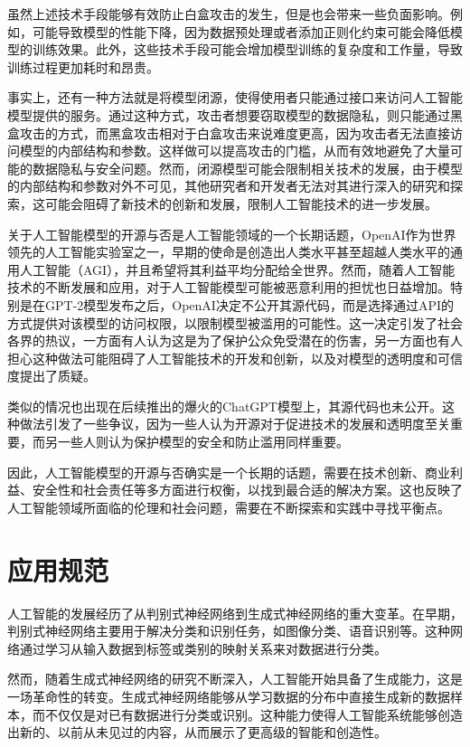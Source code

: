 虽然上述技术手段能够有效防止白盒攻击的发生，但是也会带来一些负面影响。例如，可能导致模型的性能下降，因为数据预处理或者添加正则化约束可能会降低模型的训练效果。此外，这些技术手段可能会增加模型训练的复杂度和工作量，导致训练过程更加耗时和昂贵。

事实上，还有一种方法就是将模型闭源，使得使用者只能通过接口来访问人工智能模型提供的服务。通过这种方式，攻击者想要窃取模型的数据隐私，则只能通过黑盒攻击的方式，而黑盒攻击相对于白盒攻击来说难度更高，因为攻击者无法直接访问模型的内部结构和参数。这样做可以提高攻击的门槛，从而有效地避免了大量可能的数据隐私与安全问题。然而，闭源模型可能会限制相关技术的发展，由于模型的内部结构和参数对外不可见，其他研究者和开发者无法对其进行深入的研究和探索，这可能会阻碍了新技术的创新和发展，限制人工智能技术的进一步发展。

关于人工智能模型的开源与否是人工智能领域的一个长期话题，OpenAI作为世界领先的人工智能实验室之一，早期的使命是创造出人类水平甚至超越人类水平的通用人工智能（AGI），并且希望将其利益平均分配给全世界。然而，随着人工智能技术的不断发展和应用，对于人工智能模型可能被恶意利用的担忧也日益增加。特别是在GPT-2模型发布之后，OpenAI决定不公开其源代码，而是选择通过API的方式提供对该模型的访问权限，以限制模型被滥用的可能性。这一决定引发了社会各界的热议，一方面有人认为这是为了保护公众免受潜在的伤害，另一方面也有人担心这种做法可能阻碍了人工智能技术的开发和创新，以及对模型的透明度和可信度提出了质疑。

类似的情况也出现在后续推出的爆火的ChatGPT模型上，其源代码也未公开。这种做法引发了一些争议，因为一些人认为开源对于促进技术的发展和透明度至关重要，而另一些人则认为保护模型的安全和防止滥用同样重要。

因此，人工智能模型的开源与否确实是一个长期的话题，需要在技术创新、商业利益、安全性和社会责任等多方面进行权衡，以找到最合适的解决方案。这也反映了人工智能领域所面临的伦理和社会问题，需要在不断探索和实践中寻找平衡点。

\section{应用规范}

人工智能的发展经历了从判别式神经网络到生成式神经网络的重大变革。在早期，判别式神经网络主要用于解决分类和识别任务，如图像分类、语音识别等。这种网络通过学习从输入数据到标签或类别的映射关系来对数据进行分类。

然而，随着生成式神经网络的研究不断深入，人工智能开始具备了生成能力，这是一场革命性的转变。生成式神经网络能够从学习数据的分布中直接生成新的数据样本，而不仅仅是对已有数据进行分类或识别。这种能力使得人工智能系统能够创造出新的、以前从未见过的内容，从而展示了更高级的智能和创造性。

